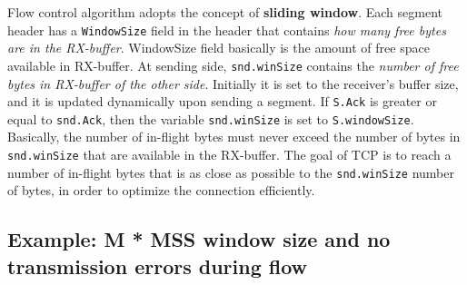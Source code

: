 \documentclass[a4paper, 11pt]{report}
\begin{document}
Flow control algorithm adopts the concept of \textbf{sliding window}. Each
segment header has a \texttt{WindowSize} field in the header that contains
\emph{how many free bytes are in the RX-buffer}. WindowSize field basically is
the amount of free space available in RX-buffer. At sending side,
\texttt{snd.winSize} contains the \emph{number of free bytes in RX-buffer of
the other side}. Initially it is set to the receiver's buffer size, and it is
updated dynamically upon sending a segment. If \texttt{S.Ack} is greater or
equal to \texttt{snd.Ack}, then the variable \texttt{snd.winSize} is set to
\texttt{S.windowSize}. Basically, the number of in-flight bytes must never
exceed the number of bytes in \texttt{snd.winSize} that are available in the
RX-buffer. The goal of TCP is to reach a number of in-flight bytes that is as
close as possible to the \texttt{snd.winSize} number of bytes, in order to
optimize the connection efficiently.

\subsection{Example: M * MSS window size and no transmission errors during flow}
\end{document}
